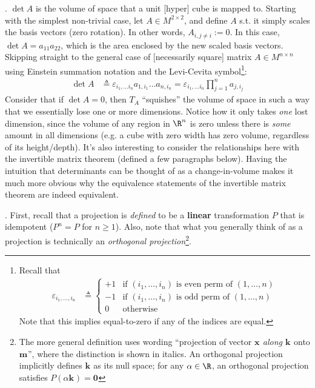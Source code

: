 \documentclass[11pt]{article}
\renewcommand\vec[2][]{\bm{#2}_{#1}}
\newcommand\myspace[1][]{\vspace{#1\bigskipamount}}
\newcommand\p{\Needspace{10\baselineskip} \noindent}
\begin{document}
\myspace
\p {}. $\det A$ is the volume of space that a unit [hyper] cube is mapped to. Starting with the simplest non-trivial case, let $A \in M^{2 \times 2}$, and define $A$ s.t. it simply scales the basis vectors (zero rotation). In other words, $A_{i, j{\ne}i} := 0$. In this case, $\det{A} = a_{11}a_{22}$, which is the area enclosed by the new scaled basis vectors. Skipping straight to the general case of [necessarily square] matrix $A \in M^{n \times n}$ using Einstein summation notation and the Levi-Cevita symbol\footnote{Recall that 
	\begin{align}
		\varepsilon_{i_1, \ldots, i_n}
			&\triangleq \begin{cases}
				+1 & \text{if }(i_1, \ldots, i_n)\text{ is even perm of }(1, \ldots, n) \\
				-1 & \text{if }(i_1, \ldots, i_n)\text{ is odd perm of }(1, \ldots, n) \\
				0 & \text{otherwise}
			\end{cases}
	\end{align}
	Note that this implies equal-to-zero if any of the indices are equal.
}:
\begin{align}
	\det A
		&\triangleq \varepsilon_{i_1, \ldots i_n} a_{1, i_1} \ldots a_{n, i_n}
		= \varepsilon_{i_1, \ldots i_n} \prod_{j=1}^{n} a_{j, i_j}
\end{align}
Consider that if $\det A = 0$, then $T_A$ ``squishes'' the volume of space in such a way that we essentially lose one or more dimensions. Notice how it only takes \textit{one} lost dimension, since the volume of any region in $\R^n$ is zero unless there is \textit{some} amount in all dimensions (e.g. a cube with zero width has zero volume, regardless of its height/depth). It's also interesting to consider the relationships here with the invertible matrix theorem (defined a few paragraphs below). Having the intuition that determinants can be thought of as a change-in-volume makes it much more obvious why the equivalence statements of the invertible matrix theorem are indeed equivalent. 

\myspace
\p {}. First, recall that a projection is \textit{defined} to be a \textbf{linear} transformation $P$ that is idempotent ($P^n = P$ for $n \ge 1$). Also, note that what you generally think of as a projection is technically an \textit{orthogonal projection}\footnote{The more general definition uses wording ``projection of vector $\vec x$ \textit{along $\vec k$} onto $\vec m$'', where the distinction is shown in italics. An orthogonal projection implicitly defines $\vec k$ as its null space; for any $\alpha \in \R$, an orthogonal projection satisfies $P( \alpha \vec k) = \vec 0$}. \\
\end{document}
